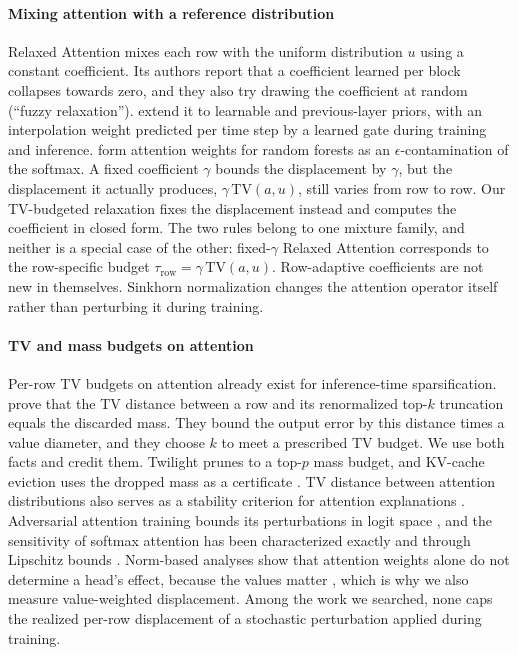 \paragraph{Mixing attention with a reference distribution}
Relaxed Attention \citep{lohrenz2021relaxed,lohrenz2023relaxed} mixes each row with the uniform
distribution $u$ using a constant coefficient. Its authors report that a coefficient learned per block
collapses towards zero, and they also try drawing the coefficient at random (``fuzzy relaxation'').
\citet{maekaku2022attention} extend it to learnable and previous-layer priors, with an
interpolation weight predicted per time step by a learned gate during training and inference.
\citet{utkin2022attention} form attention weights for random forests as an
$\epsilon$-contamination of the softmax. A fixed coefficient $\gamma$ bounds the displacement by $\gamma$,
but the displacement it actually produces, $\gamma\,\mathrm{TV}(a,u)$, still varies from row to row. Our TV-budgeted
relaxation fixes the displacement instead and computes the coefficient in closed form. The two rules
belong to one mixture family, and neither is a special case of the other: fixed-$\gamma$ Relaxed
Attention corresponds to the row-specific budget $\tau_{\mathrm{row}}=\gamma\,\mathrm{TV}(a,u)$.
Row-adaptive coefficients are not new in themselves. Sinkhorn normalization \citep{sander2022sinkformers} changes the
attention operator itself rather than perturbing it during training.

\paragraph{TV and mass budgets on attention}
Per-row TV budgets on attention already exist for inference-time sparsification. \citet{tzachristas2025topk} prove that the TV distance between a row and its renormalized top-$k$
truncation equals the discarded mass. They bound the output error by this distance times a value
diameter, and they choose $k$ to meet a prescribed TV budget. We use both facts and credit them.
Twilight \citep{lin2025twilight} prunes to a top-$p$ mass budget, and KV-cache eviction uses the dropped
mass as a certificate \citep{shi2026trustmass}. TV distance between attention distributions also serves as a
stability criterion for attention explanations \citep{jain2019attention,hu2023seat}. Adversarial attention
training bounds its perturbations in logit space \citep{kitada2021attention}, and the sensitivity of
softmax attention has been characterized exactly \citep{emadi2026exact} and through Lipschitz bounds
\citep{kim2021lipschitz}. Norm-based analyses show that attention weights alone do not determine a head's
effect, because the values matter \citep{kobayashi2020attention}, which is why we also measure
value-weighted displacement. Among the work we searched, none caps the realized per-row displacement of
a stochastic perturbation applied during training.

